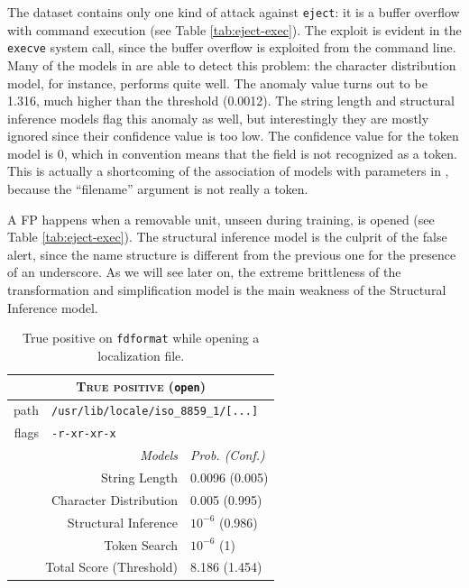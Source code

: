 The dataset contains only one kind of attack against \texttt{eject}:
it is a buffer overflow with command execution (see Table
\ref{tab:eject-exec}). The exploit is evident in the \texttt{execve}
system call, since the buffer overflow is exploited from the command
line. Many of the models in \SyscallAnomaly are able to detect this
problem: the character distribution model, for instance, performs
quite well. The anomaly value turns out to be 1.316, much higher than
the threshold (0.0012). The string length and structural inference
models flag this anomaly as well, but interestingly they are mostly
ignored since their confidence value is too low. The confidence value
for the token model is 0, which in \SyscallAnomaly convention means
that the field is not recognized as a token. This is actually a
shortcoming of the association of models with parameters in
\SyscallAnomaly, because the ``filename'' argument is not really a
token.

A \ac{FP} happens when a removable unit, unseen during training, is
opened (see Table \ref{tab:eject-exec}). The structural inference
model is the culprit of the false alert, since the name structure is
different from the previous one for the presence of an underscore. As
we will see later on, the extreme brittleness of the transformation
and simplification model is the main weakness of the Structural
Inference model.

\begin{table}[tb]
  \centering
  \begin{tabular}{rrl}
    \toprule
    \multicolumn{3}{c}{\textsc{True positive} (\texttt{open})}\\
    \midrule
    path & \multicolumn{2}{l}{\texttt{/usr/lib/locale/iso\_8859\_1/[...]}}\\
    flags & \multicolumn{2}{l}{\texttt{-r-xr-xr-x}}\\
    \cmidrule{2-3}
    & \emph{Models} & \emph{Prob. (Conf.)}\\
    \cmidrule{2-3}
    & String Length & 0.0096 (0.005)\\
    & Character Distribution& 0.005 (0.995)\\
    & Structural Inference & $10^{-6}$ (0.986)\\
    & Token Search & $10^{-6}$ (1)\\
    \midrule
    \multicolumn{2}{r}{Total Score (Threshold)} & 8.186 (1.454)\\
    \bottomrule
  \end{tabular}
  \caption{True positive on \texttt{fdformat} while opening a localization file.}
  \label{tab:fdformat-locale}
\end{table}


